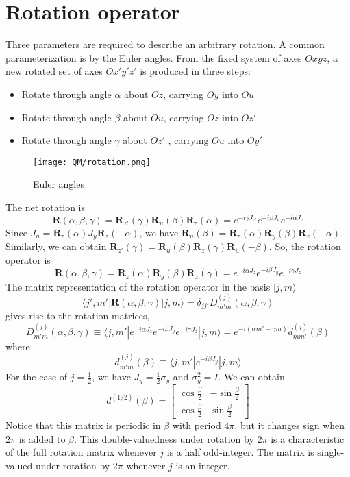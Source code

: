 \section{Rotation operator}
Three parameters are required to describe an arbitrary rotation. A common parameterization is by the Euler angles. From the fixed system of axes $Oxyz$, a new rotated set of axes $Ox'y'z'$ is produced in three steps:
\begin{itemize}
\item Rotate through angle $\alpha$ about $Oz$, carrying $Oy$ into $Ou$
\item Rotate through angle $\beta$ about $Ou$, carrying $Oz$ into $Oz'$
\item Rotate through angle $\gamma$ about $Oz'$ , carrying $Ou$ into $Oy'$
\end{itemize}
\begin{figure}[!h]
	\centering
	\texttt{[image: QM/rotation.png]}
	\caption{Euler angles}
\end{figure}
The net rotation is
\[\bm{R}(\alpha,\beta,\gamma) = \bm{R}_{z'}(\gamma) \bm{R}_{u}(\beta) \bm{R}_{z}(\alpha) = e^{-i\gamma J_{z'}} e^{-i\beta J_{u}} e^{-i\alpha J_{z}}\]
Since $J_u = \bm{R}_z(\alpha) J_y \bm{R}_z(-\alpha)$, we have $\bm{R}_u(\beta) = \bm{R}_z(\alpha) \bm{R}_y(\beta) \bm{R}_z(-\alpha)$. Similarly, we can obtain $\bm{R}_{z'}(\gamma) = \bm{R}_{u}(\beta) \bm{R}_z(\gamma) \bm{R}_u(-\beta)$. So, the rotation operator is
\[\bm{R}(\alpha,\beta,\gamma) = \bm{R}_{z}(\alpha) \bm{R}_{y}(\beta) \bm{R}_{z}(\gamma) = e^{-i\alpha J_{z}} e^{-i\beta J_{y}} e^{-i\gamma J_{z}}\]
The matrix representation of the rotation operator in the basis $|j,m\rangle$
\[\langle j',m' | \bm{R}(\alpha,\beta,\gamma) | j,m \rangle = \delta_{jj'} D_{m'm}^{(j)}(\alpha,\beta,\gamma)\]
gives rise to the rotation matrices,
\[D_{m'm}^{(j)}(\alpha,\beta,\gamma) \equiv \langle j,m' | e^{-i\alpha J_{z}} e^{-i\beta J_{y}} e^{-i\gamma J_{z}} | j,m \rangle = e^{-i(\alpha m' + \gamma m)} d_{mm'}^{(j)}(\beta)\]
where
\[ d_{m'm}^{(j)}(\beta) \equiv \langle j,m' | e^{-i\beta J_{y}} | j,m \rangle\]
For the case of $j = \frac{1}{2}$, we have $J_y = \frac{1}{2}\sigma_y$ and $\sigma_y^2 = I$. We can obtain
\[d^{(1/2)}(\beta) = \left[ \begin{matrix} \cos \frac{\beta}{2} & -\sin \frac{\beta}{2} \\ \cos \frac{\beta}{2}& \sin \frac{\beta}{2}\end{matrix} \right] \]
Notice that this matrix is periodic in $\beta$ with period $4\pi$, but it changes sign when $2\pi$ is added to $\beta$. This double-valuedness under rotation by $2\pi$ is a characteristic of the full rotation matrix whenever $j$ is a half odd-integer. The matrix is single-valued under rotation by $2\pi$ whenever $j$ is an integer.\\
